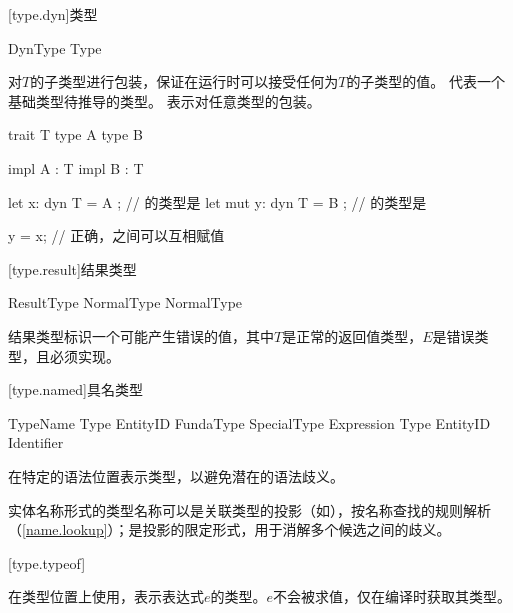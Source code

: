 [type.dyn]{类型}

\begin{bnf}{DynType}
     Type \br
     \terminal{_} \br
\end{bnf}

\pnum
{}对$T$的子类型进行包装，保证在运行时可以接受任何为$T$的子类型的值。
代表一个基础类型待推导的类型。
表示对任意类型的包装。

\enterexample
\begin{codeblock}

trait T { }
type A { }
type B { }

impl A : T { }
impl B : T { }

let x: dyn T = A { }; // 的类型是
let mut y: dyn T = B { }; // 的类型是

y = x; // 正确，之间可以互相赋值

\end{codeblock}
\exitexample

[type.result]{结果类型}

\begin{bnf}{ResultType}
    NormalType \terminal{!!} NormalType
\end{bnf}

\pnum
结果类型标识一个可能产生错误的值，其中$T$是正常的返回值类型，$E$是错误类型，且必须实现。

[type.named]{具名类型}

\begin{bnf}{TypeName}
    \terminal{(} Type \terminal{)} \br
    EntityID \br
    FundaType \br
    SpecialType \br
     \terminal{(} Expression \terminal{)} \br
    \terminal{<} Type  EntityID \terminal{>} \terminal{::} Identifier
\end{bnf}

\pnum
{}在特定的语法位置表示类型，以避免潜在的语法歧义。

\pnum
实体名称形式的类型名称可以是关联类型的投影（如），按名称查找的规则解析（\ref{name.lookup}）；是投影的限定形式，用于消解多个候选之间的歧义。

[type.typeof]{}

\pnum
{}在类型位置上使用，表示表达式$e$的类型。$e$不会被求值，仅在编译时获取其类型。


